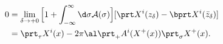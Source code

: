 \begin{equation}
\begin{split}
0&=\lim_{\delta \rightarrow +0}
\Big[1+\int_{-\infty}^\infty \d \sigma {\cal A}(\sigma)\Big]
[\prt X^i(z_\delta)-\bprt X^i(\bar z_\delta)]\\
&=\prt_\tau X^i(x)-2\pi \al 
\prt_+ A^i(X^+(x)) \prt_\sigma X^+(x).
\end{split}
\end{equation}

